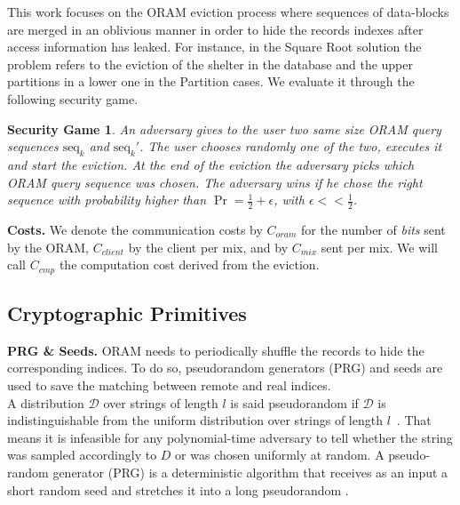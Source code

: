 \documentclass{llncs}
\newtheorem{privdef}{Privacy Definition}
\newtheorem*{secgme}{Security Game}
\begin{document}
This work focuses on the ORAM eviction process where sequences of data-blocks are merged in an oblivious manner in order to hide the records indexes after access information has leaked. For instance, in the Square Root solution the problem refers to the eviction of the shelter in the database and the upper partitions in a lower one in the Partition cases. We  evaluate it through the following security game.
%
\iffalse
\begin{privdef}
An ORAM eviction process is considered oblivious if an adversary cannot distinguish after eviction whether a specific record has been accessed.\\
That is to say, for the eviction of $s$ elements in an array of $n$ elements, and with $\epsilon =\mathcal{O}\left ( \frac{1}{n} \right )$, we have, $$ \forall i \in \llbracket 1, n \rrbracket,\ |\Pr(index_i \text{ was not retrieved} ) - \Pr(index_i \text{ was retrieved} )| \leq \epsilon$$
\label{def:Oblivious}
\end{privdef}
\fi
%
\begin{secgme}
An adversary gives to the user two same size ORAM query sequences $\text{seq}_k$ and $\text{seq}_k'$. The user chooses randomly one of the two, executes it and start the eviction. At the end of the eviction the adversary picks which ORAM query sequence was chosen. The adversary wins if he chose the right sequence with probability higher than $\Pr = \frac{1}{2}+\epsilon$, with $\epsilon<<\frac{1}{2}$.
\label{def:Game}
\end{secgme} 
%
\iffalse
\begin{privdef}{Eviction Old Security.}
An ORAM eviction process is considered secure if an adversary cannot distinguish after eviction the location of any specific record. 
\end{privdef}
\fi
%
\noindent\textbf{Costs.} We denote the communication costs by $C_{oram}$ for the number of \emph{bits} sent by the ORAM, $C_{client}$ by the client per mix, and by $C_{mix}$ sent per mix. 
We will call $C_{cmp}$ the computation cost derived from the eviction.
%
\subsection{Cryptographic Primitives}
\noindent\textbf{PRG \& Seeds.}
ORAM needs to periodically shuffle the records to hide the corresponding indices. To do so, pseudorandom generators (PRG) and seeds are used to save the matching between remote and real indices.\\
A distribution $\mathcal{D}$ over strings of length $l$ is said pseudorandom if $\mathcal{D}$ is indistinguishable from the uniform distribution over strings of length $l$~\cite{katz2014introduction}. That means it is infeasible for any polynomial-time adversary to tell whether the string was sampled accordingly to $D$ or was chosen uniformly at random. A pseudo-random generator (PRG) is a deterministic algorithm that receives as an input a short random seed and stretches it into a long pseudorandom .\\\
\end{document}

